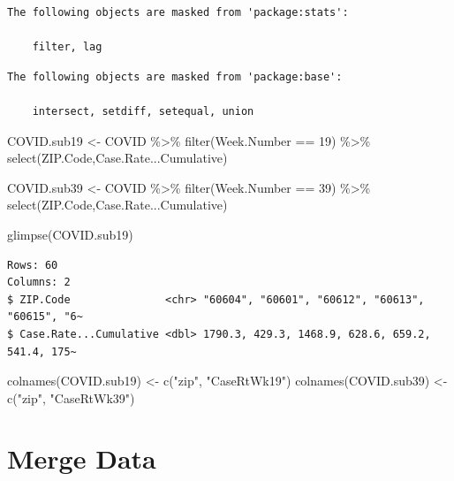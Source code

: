 \documentclass[
  letterpaper,
  DIV=11,
  numbers=noendperiod]{scrreprt}
\newenvironment{Shaded}{\begin{snugshade}}{\end{snugshade}}
\newcommand{\DecValTok}[1]{\textcolor[rgb]{0.68,0.00,0.00}{#1}}
\newcommand{\FunctionTok}[1]{\textcolor[rgb]{0.28,0.35,0.67}{#1}}
\newcommand{\NormalTok}[1]{\textcolor[rgb]{0.00,0.23,0.31}{#1}}
\newcommand{\OtherTok}[1]{\textcolor[rgb]{0.00,0.23,0.31}{#1}}
\newcommand{\SpecialCharTok}[1]{\textcolor[rgb]{0.37,0.37,0.37}{#1}}
\newcommand{\StringTok}[1]{\textcolor[rgb]{0.13,0.47,0.30}{#1}}
\begin{document}
\begin{verbatim}
The following objects are masked from 'package:stats':

    filter, lag
\end{verbatim}

\begin{verbatim}
The following objects are masked from 'package:base':

    intersect, setdiff, setequal, union
\end{verbatim}

\begin{Shaded}
\begin{Highlighting}[]
\NormalTok{COVID.sub19 }\OtherTok{\textless{}{-}}\NormalTok{ COVID }\SpecialCharTok{\%\textgreater{}\%}
    \FunctionTok{filter}\NormalTok{(Week.Number }\SpecialCharTok{==} \DecValTok{19}\NormalTok{) }\SpecialCharTok{\%\textgreater{}\%}
    \FunctionTok{select}\NormalTok{(ZIP.Code,Case.Rate...Cumulative)}

\NormalTok{COVID.sub39 }\OtherTok{\textless{}{-}}\NormalTok{ COVID }\SpecialCharTok{\%\textgreater{}\%}
    \FunctionTok{filter}\NormalTok{(Week.Number }\SpecialCharTok{==} \DecValTok{39}\NormalTok{) }\SpecialCharTok{\%\textgreater{}\%}
    \FunctionTok{select}\NormalTok{(ZIP.Code,Case.Rate...Cumulative)}

\FunctionTok{glimpse}\NormalTok{(COVID.sub19)}
\end{Highlighting}
\end{Shaded}

\begin{verbatim}
Rows: 60
Columns: 2
$ ZIP.Code               <chr> "60604", "60601", "60612", "60613", "60615", "6~
$ Case.Rate...Cumulative <dbl> 1790.3, 429.3, 1468.9, 628.6, 659.2, 541.4, 175~
\end{verbatim}

\begin{Shaded}
\begin{Highlighting}[]
\FunctionTok{colnames}\NormalTok{(COVID.sub19) }\OtherTok{\textless{}{-}} \FunctionTok{c}\NormalTok{(}\StringTok{"zip"}\NormalTok{, }\StringTok{"CaseRtWk19"}\NormalTok{)}
\FunctionTok{colnames}\NormalTok{(COVID.sub39) }\OtherTok{\textless{}{-}} \FunctionTok{c}\NormalTok{(}\StringTok{"zip"}\NormalTok{, }\StringTok{"CaseRtWk39"}\NormalTok{)}
\end{Highlighting}
\end{Shaded}

\section{Merge Data}\label{merge-data}
\end{document}
